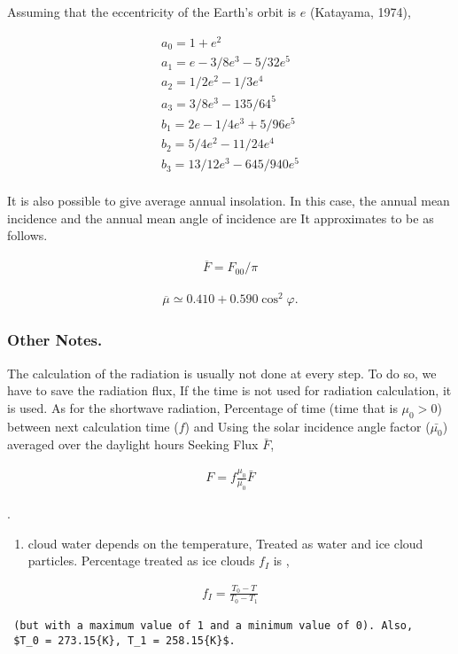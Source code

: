 Assuming that the eccentricity of the Earth's orbit is \(e\) (Katayama,
1974),

\begin{eqnarray}
   a_0  =   1 + e^2 \\
   a_1  =   e - 3/8 e^3 - 5/32 e^5 \\
   a_2  =   1/2 e^2 - 1/3e^4 \\
   a_3  =   3/8 e^3 - 135/64^5 \\
   b_1  =  2e - 1/4 e^3 + 5/96 e^5 \\
   b_2  =  5/4 e^2 - 11/24 e^4 \\
   b_3  =  13/12 e^3 - 645/940 e^5 \\
\end{eqnarray}

It is also possible to give average annual insolation. In this case, the
annual mean incidence and the annual mean angle of incidence are It
approximates to be as follows.

\begin{eqnarray}
\overline{F} = F_{00}/\pi
\end{eqnarray}

\begin{eqnarray}
\overline{\mu} \simeq 0.410 + 0.590 \cos^2 \varphi .
\end{eqnarray}

\hypertarget{other-notes.}{%
\subsubsection{Other Notes.}\label{other-notes.}}

The calculation of the radiation is usually not done at every step. To
do so, we have to save the radiation flux, If the time is not used for
radiation calculation, it is used. As for the shortwave radiation,
Percentage of time (time that is \(\mu_0>0\)) between next calculation
time (\(f\)) and Using the solar incidence angle factor
(\(\bar{\mu_0}\)) averaged over the daylight hours Seeking Flux
\(\bar{F}\),

\begin{eqnarray}
        F =  f \frac{\mu_0}{\bar{\mu_0}} \bar{F}
\end{eqnarray}

.

\begin{enumerate}
\def\labelenumi{\arabic{enumi}.}
\setcounter{enumi}{1}
\tightlist
\item
  cloud water depends on the temperature, Treated as water and ice cloud
  particles. Percentage treated as ice clouds \(f_I\) is ,
\end{enumerate}

\begin{eqnarray}
        f_I = \frac{ T_0 - T }{ T_0 - T_1 }
\end{eqnarray}

\begin{verbatim}
 (but with a maximum value of 1 and a minimum value of 0). Also,
 $T_0 = 273.15{K}, T_1 = 258.15{K}$.
\end{verbatim}
